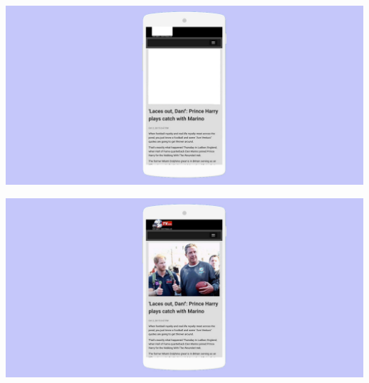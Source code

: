 \documentclass[graphic, aspectratio=169]{beamer}
\begin{document}
\begin{frame}    
    
\end{frame}

\begin{frame}
\noindent\begin{minipage}{.40\textwidth}
    
\end{minipage}\hfill
\begin{minipage}{.55\textwidth}
    
\end{minipage}
\end{frame}

{\includegraphics[width=\paperwidth,height=\paperheight]{slides/images/amp_example_without_images.jpg}}
\begin{frame}
\end{frame}

{\includegraphics[width=\paperwidth,height=\paperheight]{images/amp_example.jpg}}
\begin{frame}
\end{frame}
\end{document}
